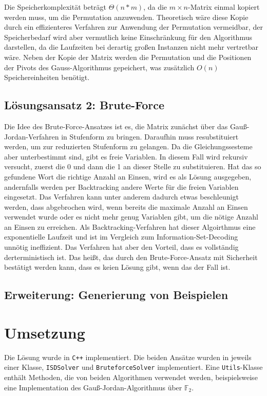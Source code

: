 \documentclass[a4paper,10pt,ngerman]{scrartcl}
\begin{document}
Die Speicherkomplexität beträgt $\Theta(n*m)$, da die $m \times n$-Matrix einmal kopiert werden muss, um die Permutation anzuwenden. Theoretisch wäre diese Kopie durch ein effizienteres Verfahren zur Anwendung der Permutation vermeidbar, der Speicherbedarf wird aber vermutlich keine Einschränkung für den Algorithmus darstellen, da die Laufzeiten bei derartig großen Instanzen nicht mehr vertretbar wäre. 
Neben der Kopie der Matrix werden die Permutation und die Positionen der Pivots des Gauss-Algorithmus gepeichert, was zusätzlich $O(n)$ Speichereinheiten benötigt. 

\subsection{Lösungsansatz 2: Brute-Force}
Die Idee des Brute-Force-Ansatzes ist es, die Matrix zunächst über das Gauß-Jordan-Verfahren in Stufenform zu bringen. Daraufhin muss resubstituiert werden, um zur reduzierten Stufenform zu gelangen. 
Da die Gleichungssesteme aber unterbestimmt sind, gibt es freie Variablen.
In diesem Fall wird rekursiv versucht, zuerst die 0 und dann die 1 an dieser Stelle zu substituieren. 
Hat das so gefundene Wort die richtige Anzahl an Einsen, wird es als Lösung ausgegeben, andernfalls werden per Backtracking andere Werte für die freien Variablen eingesetzt. 
Das Verfahren kann unter anderem dadurch etwas beschleunigt werden, dass abgebrochen wird, wenn bereits die maximale Anzahl an Einsen verwendet wurde oder es nicht mehr genug Variablen gibt, um die nötige Anzahl an Einsen zu erreichen. 
Als Backtracking-Verfahren hat dieser Algoirthmus eine exponentielle Laufzeit und ist im Vergleich zum Information-Set-Decoding unnötig ineffizient. 
Das Verfahren hat aber den Vorteil, dass es vollständig derterministisch ist.
Das heißt, das durch den Brute-Force-Ansatz mit Sicherheit bestätigt werden kann, dass es keien Lösung gibt, wenn das der Fall ist. 

\subsection{Erweiterung: Generierung von Beispielen}
\section{Umsetzung}
Die Lösung wurde in \texttt{C++} implementiert. Die beiden Ansätze wurden in jeweils einer Klasse, \lstinline{ISDSolver} und \lstinline{BruteforceSolver} implementiert. Eine \lstinline{Utils}-Klasse enthält Methoden, die von beiden Algorithmen verwendet werden, beispielsweise eine Implementation des Gauß-Jordan-Algorithmus über $\mathbb{F}_2$.
\end{document}
